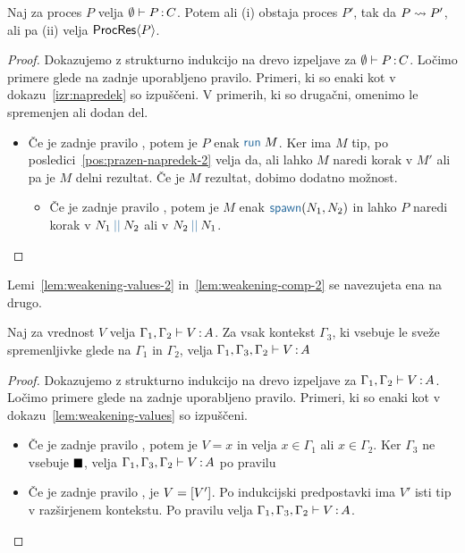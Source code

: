 \begin{izrek}[o napredku]
	Naj za proces $P$ velja $\emptyset \vdash P \mathinner{:} C$. Potem ali (i) obstaja proces $P'$, tak da $P \leadsto P'$, ali pa (ii) velja $\mathsf{ProcRes}\langle P \rangle$.
\end{izrek}

\begin{proof}
	Dokazujemo z strukturno indukcijo na drevo izpeljave za $\emptyset \vdash P \mathinner{:} C$.
	Ločimo primere glede na zadnje uporabljeno pravilo.
	Primeri, ki so enaki kot v dokazu~\ref{izr:napredek} so izpuščeni. V primerih, ki so drugačni, omenimo le spremenjen ali dodan del.
	
	\begin{itemize}
		\item Če je zadnje pravilo , potem je $P$ enak $\tmrun{M}$. Ker ima $M$ tip, po posledici~\ref{pos:prazen-napredek-2} velja da, ali lahko $M$ naredi korak v $M'$ ali pa je $M$ delni rezultat.
		Če je $M$ rezultat, dobimo dodatno možnost.
		\begin{itemize}
			\item Če je zadnje pravilo , potem je $M$ enak $\tmspawn{N_1}{N_2}$ in lahko $P$ naredi korak v $\tmpar{N_1}{N_2}$ ali v $\tmpar{N_2}{N_1}$.
		\end{itemize}		
	\end{itemize}
\end{proof}

Lemi~\ref{lem:weakening-values-2} in~\ref{lem:weakening-comp-2} se navezujeta ena na drugo.

\begin{lema}\label{lem:weakening-values-2}
	Naj za vrednost $V$ velja $\Gamma_1, \Gamma_2 \vdash V \mathinner{:} A$. Za vsak kontekst $\Gamma_3$, ki vsebuje le sveže spremenljivke glede na $\Gamma_1$ in $\Gamma_2$, velja $\Gamma_1, \Gamma_3, \Gamma_2 \vdash V \mathinner{:} A$
\end{lema}

\begin{proof}
	Dokazujemo z strukturno indukcijo na drevo izpeljave za $\Gamma_1, \Gamma_2 \vdash V \mathinner{:} A$.
	Ločimo primere glede na zadnje uporabljeno pravilo.
	Primeri, ki so enaki kot v dokazu~\ref{lem:weakening-values} so izpuščeni.
	
	\begin{itemize}
		\item Če je zadnje pravilo , potem je $V = x$ in velja $x \in \Gamma_1$ ali $x \in \Gamma_2$.
		Ker $\Gamma_3$ ne vsebuje $\blacksquare$, velja $\Gamma_1, \Gamma_3, \Gamma_2 \vdash V \mathinner{:} A$ po pravilu 
		
		\item Če je zadnje pravilo , je $V = [V']$. Po indukcijski predpostavki ima $V'$ isti tip v razširjenem kontekstu.
		Po pravilu  velja $\Gamma_1, \Gamma_3, \Gamma_2 \vdash V \mathinner{:} A$.
		
	\end{itemize}
\end{proof}

